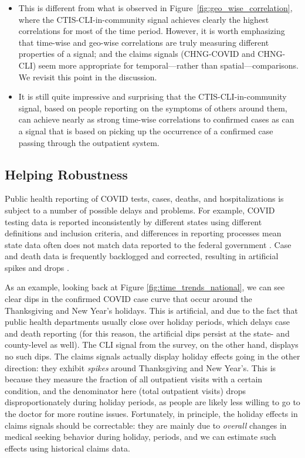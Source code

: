 \documentclass[9pt,twocolumn,twoside,lineno]{pnas-new}
\begin{document}
\begin{itemize}
\item This is different from what is observed in
  Figure~\ref{fig:geo_wise_correlation}, where the CTIS-CLI-in-community signal
  achieves clearly the highest correlations for most of the time
  period. However, it is worth emphasizing that time-wise and geo-wise
  correlations are truly measuring different properties of a signal; and the
  claims signals (CHNG-COVID and CHNG-CLI) seem more appropriate for
  temporal---rather than spatial---comparisons.  We revisit this point in the
  discussion.
\item It is still quite impressive and surprising that the CTIS-CLI-in-community
  signal, based on people reporting on the symptoms of others around them, can
  achieve  nearly as strong time-wise correlations to confirmed cases as can a
  signal that is based on picking up the occurrence of a confirmed case passing
  through the outpatient system.
\end{itemize}

\subsection{Helping Robustness}

Public health reporting of COVID tests, cases, deaths, and hospitalizations is
subject to a number of possible delays and problems. For example, COVID testing
data is reported inconsistently by different states using different definitions
and inclusion criteria, and differences in reporting processes mean state data
often does not match data reported to the federal government
\cite{Schechtman:2021}. Case and death data is frequently backlogged and
corrected, resulting in artificial spikes and drops \cite{Simon:2021,
  ArvisaisAnhalt:2021}.

As an example, looking back at Figure \ref{fig:time_trends_national}, we can see
clear dips in the confirmed COVID case curve that occur around the Thanksgiving
and New Year's holidays. This is artificial, and due to the fact that public
health departments usually close over holiday periods, which delays case and
death reporting (for this reason, the artificial dips persist at the state- and
county-level as well). The CLI signal from the survey, on the other hand,
displays no such dips. The claims signals actually display holiday effects going
in the other direction: they exhibit \textit{spikes} around Thanksgiving and New
Year's. This is because they measure the fraction of all outpatient visits with
a certain condition, and the denominator here (total outpatient visits) drops
disproportionately during holiday periods, as people are likely less willing to
go to the doctor for more routine issues. Fortunately, in principle, the holiday
effects in claims signals should be correctable: they are mainly due to
\textit{overall} changes in medical seeking behavior during holiday, periods,
and we can estimate such effects using historical claims data.
\end{document}
